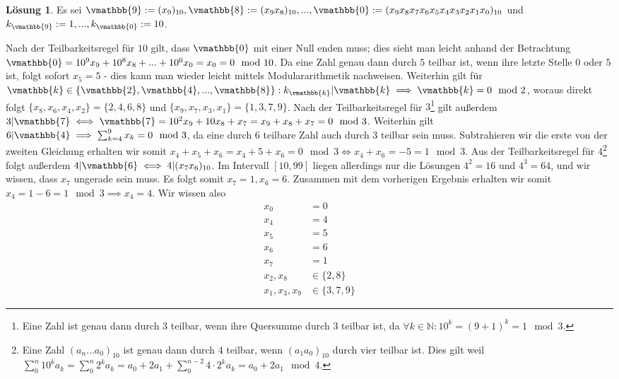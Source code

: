 \documentclass{article}
\theoremstyle{plain} %
\theoremstyle{definition} %
\newtheorem{solution}[theorem]{Lösung}
\begin{document}
\begin{solution}
  Es sei $\vmathbb{9} := (x_9)_{10}, \vmathbb{8} := (x_9x_8)_{10},..., \vmathbb{0} := (x_9x_8x_7x_6x_5x_4x_3x_2x_1x_0)_{10}$ und $k_{\vmathbb{9}} := 1, ..., k_{\vmathbb{0}} := 10$.

  Nach der Teilbarkeitsregel für $10$ gilt, dass $\vmathbb{0}$ mit einer Null enden muss; dies sieht man leicht anhand der Betrachtung $\vmathbb{0} = 10^9x_9 + 10^8x_8 + ... + 10^0x_0 = x_0 = 0\mod{10}$. Da eine Zahl genau dann durch $5$ teilbar ist, wenn ihre letzte Stelle $0$ oder $5$ ist, folgt sofort $x_5 = 5$ - dies kann man wieder leicht mittels Modulararithmetik nachweisen.
  Weiterhin gilt für $\vmathbb{k} \in \{\vmathbb{2}, \vmathbb{4}, ... , \vmathbb{8}\}: k_{\vmathbb{k}} | \vmathbb{k} \implies \vmathbb{k} = 0 \mod{2}$, woraus direkt folgt $\{x_8, x_6, x_4, x_2\} = \{2,4,6,8\}$ und $\{x_9, x_7, x_3, x_1\} = \{1,3,7,9\}$.
  Nach der Teilbarkeitsregel für $3$\footnote{Eine Zahl ist genau dann durch 3 teilbar, wenn ihre Quersumme durch 3 teilbar ist, da $\forall k \in \mathbb{N} : 10^k = (9+1)^k = 1 \mod{3}$.} gilt außerdem $3 | \vmathbb{7} \iff \vmathbb{7} = 10^2 x_9 + 10 x_8 + x_7 = x_9 + x_8 + x_7 = 0 \mod{3}$. Weiterhin gilt $6 | \vmathbb{4} \implies \sum_{k=4}^9 x_k = 0 \mod{3}$, da eine durch 6 teilbare Zahl auch durch 3 teilbar sein muss. Subtrahieren wir die erste von der zweiten Gleichung erhalten wir somit $x_4 + x_5 + x_6 = x_4 + 5 + x_6 = 0 \mod{3} \iff x_4 + x_6 = -5 = 1 \mod{3}$. Aus der Teilbarkeitsregel für $4$\footnote{Eine Zahl $(a_n...a_0)_{10}$ ist genau dann durch 4 teilbar, wenn $(a_1a_0)_{10}$ durch vier teilbar ist. Dies gilt weil $\sum_0^n 10^k a_k = \sum_0^n 2^k a_k = a_0 + 2 a_1 + \sum_0^{n-2} 4 \cdot 2^k a_k = a_0 + 2a_1 \mod{4}$.} folgt außerdem $4 | \vmathbb{6} \iff 4 | (x_7 x_6)_{10}$. Im Intervall $[10,99]$ liegen allerdings nur die Lösungen $4^2 = 16$ und $4^3 = 64$, und wir wissen, dass $x_7$ ungerade sein muss. Es folgt somit $x_7 = 1, x_6 = 6$. Zusammen mit dem vorherigen Ergebnis erhalten wir somit $x_4 = 1 - 6 = 1 \mod{3} \implies x_4 = 4$. Wir wissen also \begin{align*}
    x_0           & = 0           \\
    x_4           & = 4           \\
    x_5           & = 5           \\
    x_6           & = 6           \\
    x_7           & = 1           \\
    x_2, x_8      & \in \{2,8\}   \\
    x_1, x_3, x_9 & \in \{3,7,9\}
  \end{align*}


\end{solution}
\end{document}
